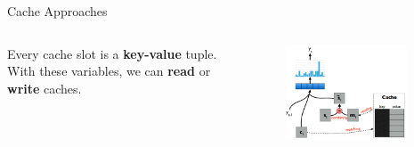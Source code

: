 \begin{frame}[c]{Cache Approaches}
	\begin{columns}[c] %
		\begin{column}{.50\textwidth}
			Every cache slot is a \textbf{key-value} tuple. With these variables, we can \textbf{read} or \textbf{write} caches.
			\vspace{0.3cm}
		\end{column}%
		\hfill%
		\begin{column}{.50\textwidth}
			\begin{figure}
				\centering
				\includegraphics[width=0.9\textwidth]{Images/cache_only}
				\label{fig:cacheonly}
			\end{figure}
		\end{column}%
	\end{columns} 
\end{frame}

